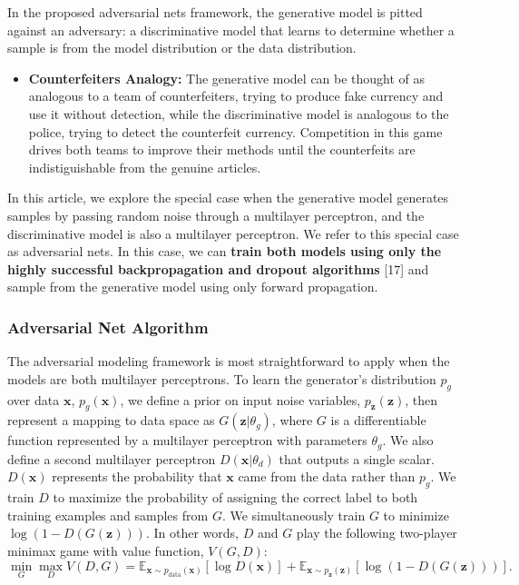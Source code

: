 In the proposed adversarial nets framework, the generative model is pitted against an adversary: a discriminative model that learns to determine whether a sample is from the model distribution or the data distribution.
\begin{itemize}
\item \textbf{Counterfeiters Analogy: } The generative model can be thought of as analogous to a team of counterfeiters, trying to produce fake currency and use it without detection, while the discriminative model is analogous to the police, trying to detect the counterfeit currency. Competition in this game drives both teams to improve their methods until the counterfeits are indistiguishable from the genuine articles.
\end{itemize}
In this article, we explore the special case when the generative model generates samples by passing random noise through a multilayer perceptron, and the discriminative model is also a multilayer perceptron. We refer to this special case as adversarial nets. In this case, we can \textbf{train both models using only the highly successful backpropagation and dropout algorithms} [17] and sample from the generative model using only forward propagation.

\subsubsection*{Adversarial Net Algorithm}
The adversarial modeling framework is most straightforward to apply when the models are both multilayer perceptrons. To learn the generator’s distribution $p_g$ over data $\bm{x}$, $p_g(\bm{x})$, we define a prior on input noise variables, $p_{\bm{z}}(\bm{z})$, then represent a mapping to data space as $G(\bm{z}| \theta_g)$, where $G$ is a differentiable function represented by a multilayer perceptron with parameters $\theta_g$. We also define a second multilayer perceptron $D(\bm{x} | \theta_d)$ that outputs a single scalar. $D(\bm{x})$ represents the probability that $\bm{x}$ came from the data rather than $p_g$. We train $D$ to maximize the probability of assigning the correct label to both training examples and samples from $G$. We simultaneously train $G$ to minimize $ \log(1 - D(G(\bm{z})))$. In other words, $D$ and $G$ play the following two-player minimax game with value function, $V(G,D)$:
\[
	\min_G\max_D V(D,G) =
	\mathbb{E}_{\bm{x}\sim p_{\text{data}}(\bm{x})}
	\left[ \log D(\bm{x}) \right]
	+
	\mathbb{E}_{\bm{x}\sim p_{\bm{z}}(\bm{z})}
	\left[ \log\left( 1 - D(G(\bm{z})) \right) \right].
\]

